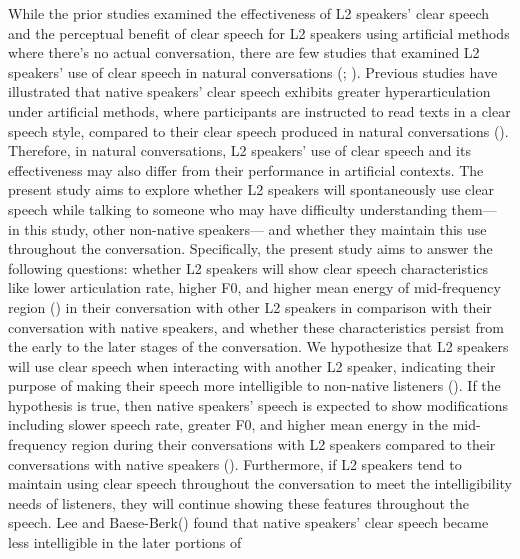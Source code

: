 \documentclass[
  man,
  floatsintext,
  longtable,
  nolmodern,
  notxfonts,
  notimes,
  colorlinks=true,linkcolor=blue,citecolor=blue,urlcolor=blue]{apa7}
\begin{document}
While the prior studies examined the effectiveness of L2 speakers' clear
speech and the perceptual benefit of clear speech for L2 speakers using
artificial methods where there's no actual conversation, there are few
studies that examined L2 speakers' use of clear speech in natural
conversations (;
). Previous studies have illustrated that native speakers' clear
speech exhibits greater hyperarticulation under artificial methods,
where participants are instructed to read texts in a clear speech style,
compared to their clear speech produced in natural conversations
().
Therefore, in natural conversations, L2 speakers' use of clear speech
and its effectiveness may also differ from their performance in
artificial contexts. The present study aims to explore whether L2
speakers will spontaneously use clear speech while talking to someone
who may have difficulty understanding them--- in this study, other
non-native speakers--- and whether they maintain this use throughout the
conversation. Specifically, the present study aims to answer the
following questions: whether L2 speakers will show clear speech
characteristics like lower articulation rate, higher F0, and higher mean
energy of mid-frequency region () in their conversation with other L2 speakers in comparison
with their conversation with native speakers, and whether these
characteristics persist from the early to the later stages of the
conversation. We hypothesize that L2 speakers will use clear speech when
interacting with another L2 speaker, indicating their purpose of making
their speech more intelligible to non-native listeners
(). If the
hypothesis is true, then native speakers' speech is expected to show
modifications including slower speech rate, greater F0, and higher mean
energy in the mid-frequency region during their conversations with L2
speakers compared to their conversations with native speakers
(). Furthermore, if
L2 speakers tend to maintain using clear speech throughout the
conversation to meet the intelligibility needs of listeners, they will
continue showing these features throughout the speech. Lee and
Baese-Berk() found that native
speakers' clear speech became less intelligible in the later portions of
\end{document}
